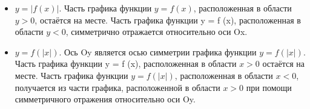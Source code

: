 \begin{itemize}
    \item $y = | f (x)|$. Часть графика функции $y = f (x)$, расположенная в области $y>0$, остаётся на месте. Часть графика функции   y = f (x), расположенная в области $y < 0$, симметрично отражается относительно оси Ox.
    \item $y = f (| x|)$. Ось Oy является осью симметрии
    графика функции   $y = f (| x|)$. Часть графика функции   y = f (x), расположенная в области $x>0$ остаётся на месте. Часть графика функции $y = f (| x|)$, расположенная в области $x < 0$,
    получается из части графика, расположенной в области $x>0$ при помощи симметричного отражения относительно оси Oy.
\end{itemize}

\begin{figure}[h!]
	\begin{minipage}[h]{0.49\linewidth}
	\end{minipage}
	\hfill
	\begin{minipage}[h]{0.49\linewidth}
	\end{minipage}
	\label{ris:image1}
\end{figure}

